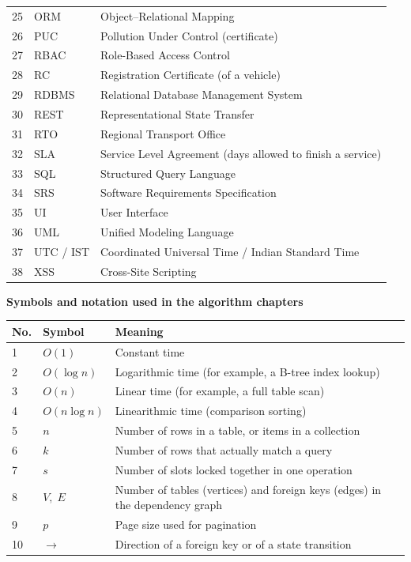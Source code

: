 \begin{longtable}{@{}p{0.9cm}p{2.9cm}p{9.4cm}@{}}
25 & ORM & Object--Relational Mapping\\
26 & PUC & Pollution Under Control (certificate)\\
27 & RBAC & Role-Based Access Control\\
28 & RC & Registration Certificate (of a vehicle)\\
29 & RDBMS & Relational Database Management System\\
30 & REST & Representational State Transfer\\
31 & RTO & Regional Transport Office\\
32 & SLA & Service Level Agreement (days allowed to finish a service)\\
33 & SQL & Structured Query Language\\
34 & SRS & Software Requirements Specification\\
35 & UI & User Interface\\
36 & UML & Unified Modeling Language\\
37 & UTC / IST & Coordinated Universal Time / Indian Standard Time\\
38 & XSS & Cross-Site Scripting\\
\bottomrule
\end{longtable}
\endgroup

\vspace{0.4cm}
\textbf{Symbols and notation used in the algorithm chapters}

\begingroup\small
\begin{longtable}{@{}p{0.9cm}p{2.9cm}p{9.4cm}@{}}
\toprule \textbf{No.} & \textbf{Symbol} & \textbf{Meaning} \\ \midrule \endhead
1 & $O(1)$ & Constant time\\
2 & $O(\log n)$ & Logarithmic time (for example, a B-tree index lookup)\\
3 & $O(n)$ & Linear time (for example, a full table scan)\\
4 & $O(n\log n)$ & Linearithmic time (comparison sorting)\\
5 & $n$ & Number of rows in a table, or items in a collection\\
6 & $k$ & Number of rows that actually match a query\\
7 & $s$ & Number of slots locked together in one operation\\
8 & $V,\;E$ & Number of tables (vertices) and foreign keys (edges) in the dependency graph\\
9 & $p$ & Page size used for pagination\\
10 & $\rightarrow$ & Direction of a foreign key or of a state transition\\
\bottomrule
\end{longtable}
\endgroup
\clearpage
